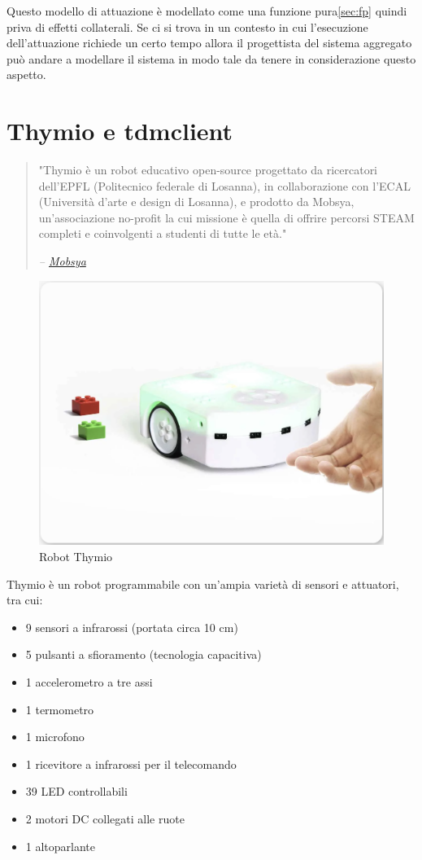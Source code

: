 \documentclass[12pt,a4paper,openright,twoside]{book}
\begin{document}
Questo modello di attuazione è modellato come una funzione pura\cref{sec:fp} quindi priva di effetti collaterali. Se ci si trova in un contesto in cui l'esecuzione dell'attuazione richiede un certo tempo allora il progettista del sistema aggregato può andare a modellare il sistema in modo tale da tenere in considerazione questo aspetto.




\section{Thymio e tdmclient}

\begin{quote}
    \raggedright
    "Thymio è un robot educativo open-source progettato da ricercatori dell'EPFL (Politecnico federale di Losanna), in collaborazione con l'ECAL (Università d'arte e design di Losanna), e prodotto da Mobsya, un'associazione no-profit la cui missione è quella di offrire percorsi STEAM completi e coinvolgenti a studenti di tutte le età."
    \begin{flushright}
        \textit{-- \href{https://www.thymio.org/}{Mobsya}}
    \end{flushright}
\end{quote}

\begin{figure}
    \centering
    \includegraphics[width=.7\linewidth]{figures/thymio.png}
    \caption{Robot Thymio}
    \label{fig:interpreter-vs-compiler-robot}
\end{figure}

Thymio è un robot programmabile con un'ampia varietà di sensori e attuatori, tra cui:
\begin{itemize}
    \item 9 sensori a infrarossi (portata circa 10 cm)
    \item 5 pulsanti a sfioramento (tecnologia capacitiva)
    \item 1 accelerometro a tre assi
    \item 1 termometro
    \item 1 microfono
    \item 1 ricevitore a infrarossi per il telecomando
    \item 39 LED controllabili
    \item 2 motori DC collegati alle ruote
    \item 1 altoparlante
\end{itemize}
\end{document}
